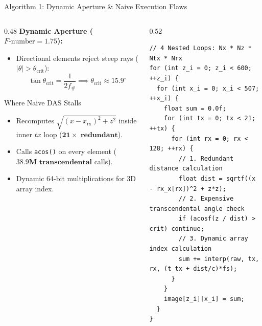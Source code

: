 \documentclass[aspectratio=169,10pt]{beamer}
\begin{document}
\begin{frame}[fragile]{Algorithm 1: Dynamic Aperture \& Naive Execution Flaws}
  \begin{columns}[T]
    \begin{column}{0.48\textwidth}
      \textbf{\small Dynamic Aperture ($F\text{-number} = 1.75$):}
      \scriptsize
      \begin{itemize}
        \item Directional elements reject steep rays ($|\theta| > \theta_{\text{crit}}$):
        $$\tan \theta_{\text{crit}} = \frac{1}{2 f_{\#}} \implies \theta_{\text{crit}} \approx 15.9^\circ$$
      \end{itemize}
      \begin{alertblock}{Where Naive DAS Stalls}
        \scriptsize
        \begin{itemize}
          \item Recomputes $\sqrt{(x - x_{\text{rx}})^2 + z^2}$ inside inner $tx$ loop ($\mathbf{21\times\text{ redundant}}$).
          \item Calls \texttt{acos()} on every element ($\mathbf{38.9\text{M\ transcendental}}$ calls).
          \item Dynamic 64-bit multiplications for 3D array index.
        \end{itemize}
      \end{alertblock}
    \end{column}
    \begin{column}{0.52\textwidth}
\begin{lstlisting}[caption={Naive DAS Implementation (Unoptimized)}]
// 4 Nested Loops: Nx * Nz * Ntx * Nrx
for (int z_i = 0; z_i < 600; ++z_i) {
  for (int x_i = 0; x_i < 507; ++x_i) {
    float sum = 0.0f;
    for (int tx = 0; tx < 21; ++tx) {
      for (int rx = 0; rx < 128; ++rx) {
        // 1. Redundant distance calculation
        float dist = sqrtf((x - rx_x[rx])^2 + z*z);
        // 2. Expensive transcendental angle check
        if (acosf(z / dist) > crit) continue;
        // 3. Dynamic array index calculation
        sum += interp(raw, tx, rx, (t_tx + dist/c)*fs);
      }
    }
    image[z_i][x_i] = sum;
  }
}
\end{lstlisting}
    \end{column}
  \end{columns}
\end{frame}
\end{document}
